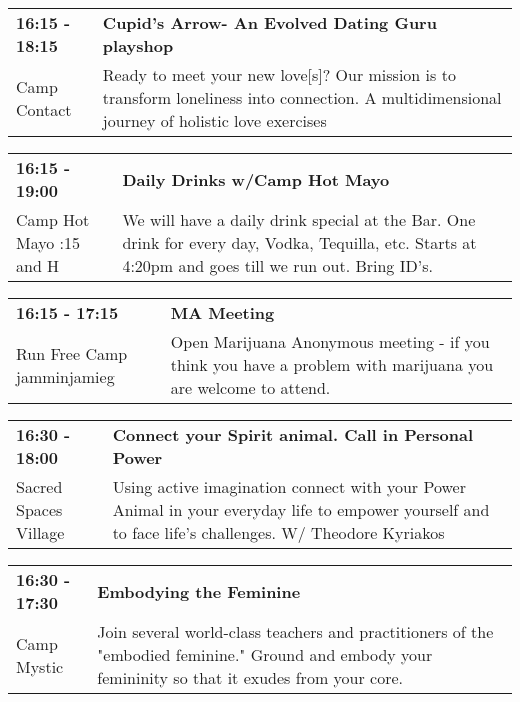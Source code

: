 \begin{tabular}{ p{1in} p{2.2in} }
    \textbf{16:15 - 18:15} & \textbf{Cupid's Arrow- An Evolved Dating Guru playshop} \\
    Camp Contact \newline  & Ready to meet your new love[s]? Our mission is to transform loneliness into connection. A multidimensional journey of holistic love exercises \\
    \hline 
\end{tabular}
    
\begin{tabular}{ p{1in} p{2.2in} }
    \textbf{16:15 - 19:00} & \textbf{Daily Drinks w/Camp Hot Mayo} \\
    Camp Hot Mayo \newline 9:15 and H & We will have a daily drink special at the Bar.  One drink for every day, Vodka, Tequilla, etc.  Starts at 4:20pm and goes till we run out. Bring ID's. \\
    \hline 
\end{tabular}
    
\begin{tabular}{ p{1in} p{2.2in} }
    \textbf{16:15 - 17:15} & \textbf{MA Meeting} \\
    Run Free Camp \newline jamminjamieg & Open Marijuana Anonymous meeting - if you think you have a problem with marijuana you are welcome to attend. \\
    \hline 
\end{tabular}
    
\begin{tabular}{ p{1in} p{2.2in} }
    \textbf{16:30 - 18:00} & \textbf{Connect your Spirit animal. Call in Personal Power} \\
    Sacred Spaces Village \newline  & Using active imagination connect with your Power Animal in your everyday life to empower yourself and to face life's challenges.  W/ Theodore Kyriakos \\
    \hline 
\end{tabular}
    
\begin{tabular}{ p{1in} p{2.2in} }
    \textbf{16:30 - 17:30} & \textbf{Embodying the Feminine} \\
    Camp Mystic \newline  & Join several world-class teachers and practitioners of the "embodied feminine." Ground and embody your femininity so that it exudes from your core. \\
    \hline 
\end{tabular}
    
